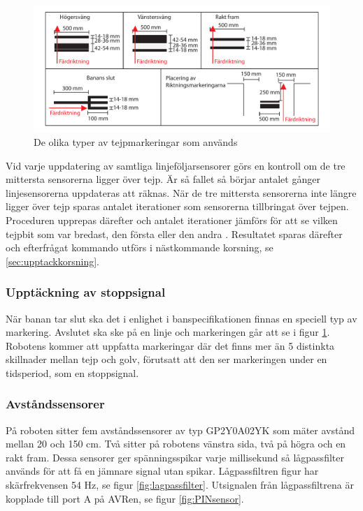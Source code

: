 \begin{figure}[H]
  \centering
 \includegraphics[angle=0,scale=0.5]{bilder/tejpmarkeringar.pdf}
  \caption{De olika typer av tejpmarkeringar som används}
  \label{fig:tejpmarkeringar}
\end{figure}


Vid varje uppdatering av samtliga linjeföljarsensorer görs en kontroll om de 
tre mittersta sensorerna ligger över tejp. Är så fallet så börjar antalet 
gånger linjesensorerna uppdateras att räknas. När de tre mittersta sensorerna 
inte längre ligger över tejp sparas antalet iterationer som sensorerna 
tillbringat över tejpen. Proceduren upprepas därefter och antalet iterationer 
jämförs för att se vilken tejpbit som var bredast, den första eller den andra
. Resultatet sparas därefter och efterfrågat kommando utförs i nästkommande 
korsning, se \ref{sec:upptackkorsning}.

\subsubsection{Upptäckning av stoppsignal}
När banan tar slut ska det i enlighet i banspecifikationen finnas en speciell typ av 
markering. Avslutet ska ske på en linje och markeringen går att se i figur \ref{fig:tejpmarkeringar}.
Robotens kommer att uppfatta markeringar där det finns mer än 5 distinkta skillnader mellan tejp och golv, förutsatt att den ser markeringen under en tidsperiod, som en stoppsignal. 


\subsubsection{Avståndssensorer}
På roboten sitter fem avståndssensorer av typ GP2Y0A02YK som mäter avstånd
mellan 20 och 150 cm. Två sitter på robotens vänstra sida, två på högra och en
rakt fram. Dessa sensorer ger spänningsspikar varje millisekund så lågpassfilter
används för att få en jämnare signal utan spikar. Lågpassfiltren figur
har skärfrekvensen 54 Hz, se figur \ref{fig:lagpassfilter}. Utsignalen från
lågpassfiltrena är kopplade till port A på AVRen, se figur \ref{fig:PINsensor}.

